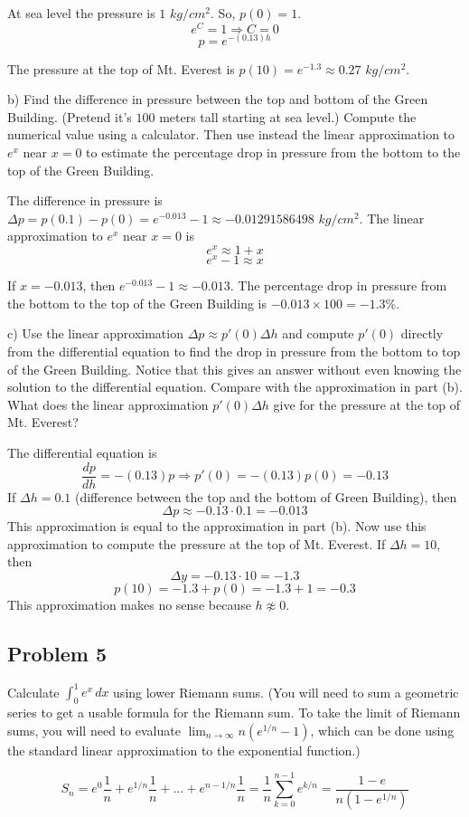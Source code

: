 \documentclass{article}
\begin{document}
\par At sea level the pressure is $1$ $kg/cm^2$. So, $p(0) = 1$.
\[ e^C = 1 \Rightarrow C = 0 \]
\[ p = e^{-(0.13)h}\]

\par The pressure at the top of Mt. Everest is $p(10) = e^{-1.3} \approx 0.27$ $kg/cm^2$.

\begin{tcolorbox}
    b) Find the difference in pressure between the top and bottom of the Green Building. (Pretend it's $100$ meters tall starting at sea level.) Compute the numerical value using a calculator. Then use instead the linear approximation to $e^x$ near $x = 0$ to estimate the percentage drop in pressure from the bottom to the top of the Green Building. 
\end{tcolorbox}
The difference in pressure is $\Delta p = p(0.1) - p(0) = e^{-0.013}-1 \approx -0.01291586498$ $kg/cm^2$.
The linear approximation to $e^x$ near $x = 0$ is
\[ e^x \approx 1 + x \]
\[ e^x - 1 \approx x \]

\par If $x = -0.013$, then $e^{-0.013} - 1 \approx -0.013$. The percentage drop in pressure from the bottom to the top of the Green Building is $-0.013 \times 100 = -1.3\%$.

\begin{tcolorbox}
    c) Use the linear approximation $\Delta p \approx p'(0)\Delta h$ and compute $p'(0)$ directly from the differential equation to find the drop in pressure from the bottom to top of the Green Building. Notice that this gives an answer without even knowing the solution to the differential equation. Compare with the approximation in part (b). What does the linear approximation $p'(0)\Delta h$ give for the pressure at the top of Mt. Everest? 
\end{tcolorbox}
The differential equation is 
\[ \frac{dp}{dh} = -(0.13)p \Rightarrow p'(0) = -(0.13)p(0) = -0.13 \]
If $\Delta h = 0.1$ (difference between the top and the bottom of Green Building), then
\[ \Delta p \approx -0.13 \cdot 0.1 = -0.013 \]
This approximation is equal to the approximation in part (b).
Now use this approximation to compute the pressure at the top of Mt. Everest. If $\Delta h = 10$, then
\[ \Delta y = -0.13 \cdot 10 = -1.3 \]
\[ p(10) = -1.3 + p(0) = -1.3 + 1 = -0.3  \]
This approximation makes no sense because $h \not\approx 0$.

\subsection{Problem 5}
\begin{tcolorbox}
    Calculate $\int_{0}^{1}{e^x \, dx}$ using lower Riemann sums. (You will need to sum a geometric series to get a usable formula for the Riemann sum. To take the limit of Riemann sums, you will need to evaluate $\lim_{n \to \infty} n(e^{1/n} - 1)$, which can be done using the standard linear approximation to the exponential function.)
\end{tcolorbox}
\[ S_n = e^0\frac{1}{n} + e^{1/n}\frac{1}{n} + \dots + e^{n-1/n}\frac{1}{n} = \frac{1}{n}\sum \limits_{k = 0}^{n-1} {e^{k/n}} = \frac{1 - e}{n(1 - e^{1/n})} \]
\end{document}
